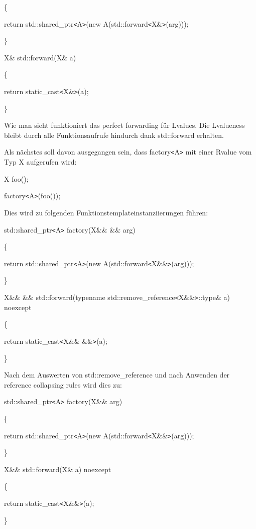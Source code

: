 \documentclass{article}
\begin{document}
\{    

\parindent=14pt
return std::shared\_ptr\texttt{<}A\texttt{>}(new A(std::forward\texttt{<}X\&\texttt{>}(arg)));

\parindent=0pt
\}

X\& std::forward(X\& a)

\{    

\parindent=14pt
return static\_cast\texttt{<}X\&\texttt{>}(a);

\parindent=0pt
\}

Wie man sieht funktioniert das perfect forwarding für Lvalues. Die Lvalueness 
bleibt durch alle Funktionsaufrufe hindurch dank std::forward erhalten.

Als nächstes soll davon ausgegangen sein, dass factory\texttt{<}A\texttt{>} mit 
einer Rvalue vom Typ X aufgerufen wird:

X foo();

factory\texttt{<}A\texttt{>}(foo());

Dies wird zu folgenden Funktionstemplateinstanziierungen führen:

std::shared\_ptr\texttt{<}A\texttt{>} factory(X\&\& \&\& arg)

\{    

\parindent=14pt
return std::shared\_ptr\texttt{<}A\texttt{>}(new A(std::forward\texttt{<}X\&\&\texttt{>}(arg)));

\parindent=0pt
\}

X\&\& \&\& std::forward(typename std::remove\_reference\texttt{<}X\&\&\texttt{>}::type\& 
a) noexcept

\{    

\parindent=14pt
return static\_cast\texttt{<}X\&\& \&\&\texttt{>}(a);

\parindent=0pt
\}

Nach dem Auswerten von std::remove\_reference und nach Anwenden der reference collapsing 
rules wird dies zu:

std::shared\_ptr\texttt{<}A\texttt{>} factory(X\&\& arg)

\{    

\parindent=14pt
return std::shared\_ptr\texttt{<}A\texttt{>}(new A(std::forward\texttt{<}X\&\&\texttt{>}(arg)));

\parindent=0pt
\}

X\&\& std::forward(X\& a) noexcept

\{    

\parindent=14pt
return static\_cast\texttt{<}X\&\&\texttt{>}(a);

\parindent=0pt
\}
\end{document}

